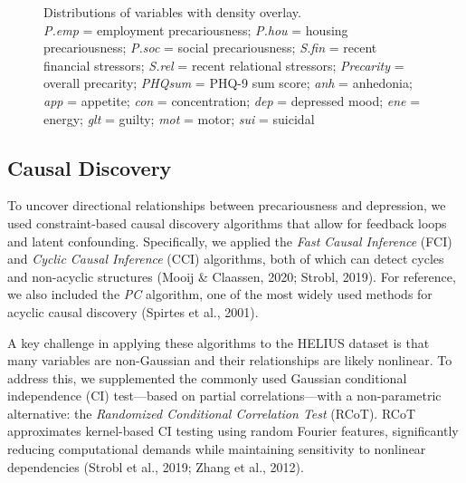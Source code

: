 \documentclass[
]{article}
\begin{document}
\begin{figure}


\caption{\label{fig-dist}Distributions of variables with density
overlay.\\
\emph{P.emp} = employment precariousness; \emph{P.hou} = housing
precariousness; \emph{P.soc} = social precariousness; \emph{S.fin} =
recent financial stressors; \emph{S.rel} = recent relational stressors;
\emph{Precarity} = overall precarity; \emph{PHQsum} = PHQ-9 sum score;
\emph{anh} = anhedonia; \emph{app} = appetite; \emph{con} =
concentration; \emph{dep} = depressed mood; \emph{ene} = energy;
\emph{glt} = guilty; \emph{mot} = motor; \emph{sui} = suicidal}

\end{figure}%

\subsection{Causal Discovery}\label{sec-analysis}

To uncover directional relationships between precariousness and
depression, we used constraint-based causal discovery algorithms that
allow for feedback loops and latent confounding. Specifically, we
applied the \emph{Fast Causal Inference} (FCI) and \emph{Cyclic Causal
Inference} (CCI) algorithms, both of which can detect cycles and
non-acyclic structures (Mooij \& Claassen, 2020; Strobl, 2019). For
reference, we also included the \emph{PC} algorithm, one of the most
widely used methods for acyclic causal discovery (Spirtes et al., 2001).

A key challenge in applying these algorithms to the HELIUS dataset is
that many variables are non-Gaussian and their relationships are likely
nonlinear. To address this, we supplemented the commonly used Gaussian
conditional independence (CI) test---based on partial
correlations---with a non-parametric alternative: the \emph{Randomized
Conditional Correlation Test} (RCoT). RCoT approximates kernel-based CI
testing using random Fourier features, significantly reducing
computational demands while maintaining sensitivity to nonlinear
dependencies (Strobl et al., 2019; Zhang et al., 2012).
\end{document}
